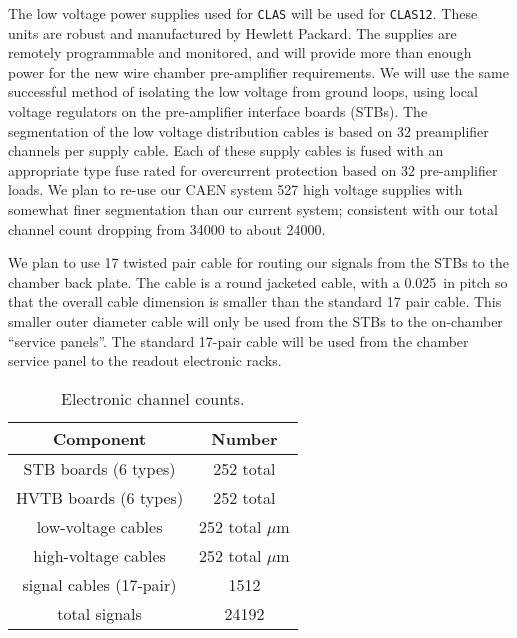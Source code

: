 \documentclass[12pt]{article}
\begin{document}
The low voltage power supplies used for {\tt CLAS} will be used for {\tt CLAS12}.  
These units are robust and manufactured by Hewlett Packard.  The supplies are 
remotely programmable and monitored, and will provide more than enough power for 
the new wire chamber pre-amplifier requirements.  We will use the same successful 
method of isolating the low voltage from ground loops, using local voltage 
regulators on the pre-amplifier interface boards (STBs).  The segmentation of the 
low voltage distribution cables is based on 32 preamplifier channels per supply 
cable.  Each of these supply cables is fused with an appropriate type fuse rated 
for overcurrent protection based on 32 pre-amplifier loads.  We plan to re-use 
our CAEN system 527 high voltage supplies with somewhat finer segmentation than 
our current system; consistent with our total channel count dropping from 34000 
to about 24000.

We plan to use 17 twisted pair cable for routing our signals from the STBs
to the chamber back plate.  The cable is a round jacketed cable, with a 
0.025~in pitch so that the overall cable dimension is smaller than the 
standard 17 pair cable.  This smaller outer diameter cable will only be used 
from the STBs to the on-chamber ``service panels''.  The standard 17-pair 
cable will be used from the chamber service panel to the readout electronic racks.

\begin{table}[htbp]
\begin{center}
\begin{tabular} {||c|c||} \hline \hline
{\bf Component}      &  {\bf Number} \\ \hline
STB boards (6 types)   & 252 total \\ \hline
HVTB boards (6 types)   & 252 total \\ \hline
low-voltage cables   & 252 total $\mu$m \\ \hline
high-voltage cables   & 252 total $\mu$m \\ \hline
signal cables (17-pair)   & 1512 \\ \hline
total signals   & 24192 \\ \hline \hline
\end{tabular}
\caption{\small{Electronic channel counts.}}
\label{electronic-channels}
\end{center}
\end{table}
\end{document}
